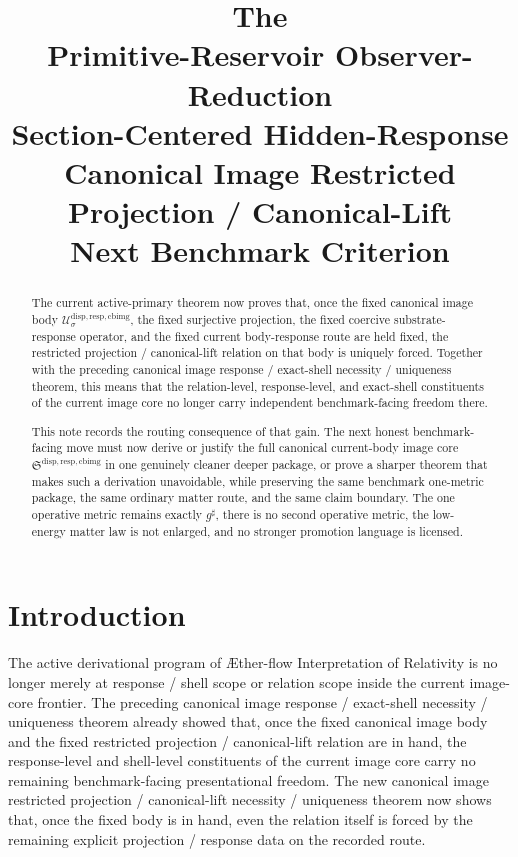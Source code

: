 \documentclass[11pt]{article}
\title{\textbf{The \TheoryName{}}\\[0.4em]
\large Primitive-Reservoir Observer-Reduction\\
\large Section-Centered Hidden-Response\\
\large Canonical Image Restricted Projection / Canonical-Lift\\
\large Next Benchmark Criterion}
\author{}
\date{}
\newcommand{\Aflow}{\AE{}ther-flow}
\newcommand{\TheoryName}{\Aflow{} Interpretation of Relativity}
\newcommand{\CompletedMetric}{g^{\sharp}}
\newcommand{\CurrentBodyImageCore}{\mathfrak S^{\mathrm{disp,resp,cbimg}}}
\newcommand{\CanonicalImageBody}[1]{\mathcal U_{#1}^{\mathrm{disp,resp,cbimg}}}
\begin{document}
\maketitle

\begin{abstract}
The current active-primary theorem now proves that, once the fixed canonical image body \(\CanonicalImageBody{\sigma}\), the fixed surjective projection, the fixed coercive substrate-response operator, and the fixed current body-response route are held fixed, the restricted projection / canonical-lift relation on that body is uniquely forced. Together with the preceding canonical image response / exact-shell necessity / uniqueness theorem, this means that the relation-level, response-level, and exact-shell constituents of the current image core no longer carry independent benchmark-facing freedom there.

This note records the routing consequence of that gain. The next honest benchmark-facing move must now derive or justify the full canonical current-body image core \(\CurrentBodyImageCore\) in one genuinely cleaner deeper package, or prove a sharper theorem that makes such a derivation unavoidable, while preserving the same benchmark one-metric package, the same ordinary matter route, and the same claim boundary. The one operative metric remains exactly \(\CompletedMetric\), there is no second operative metric, the low-energy matter law is not enlarged, and no stronger promotion language is licensed.
\end{abstract}

\section{Introduction}

The active derivational program of \TheoryName{} is no longer merely at response / shell scope or relation scope inside the current image-core frontier. The preceding canonical image response / exact-shell necessity / uniqueness theorem already showed that, once the fixed canonical image body and the fixed restricted projection / canonical-lift relation are in hand, the response-level and shell-level constituents of the current image core carry no remaining benchmark-facing presentational freedom. The new canonical image restricted projection / canonical-lift necessity / uniqueness theorem now shows that, once the fixed body is in hand, even the relation itself is forced by the remaining explicit projection / response data on the recorded route.
\end{document}
